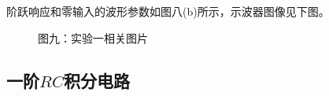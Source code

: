 \documentclass[a4paper]{article}
\begin{document}
    {{阶跃响应和零输入的波形参数如图八(b)所示，示波器图像见下图。}}

    \begin{figure}[htb]
        \centering
        \caption{\small 图九：实验一相关图片}
    \end{figure}

    \vspace{1cm}

    \subsection{一阶$RC$积分电路}\label{subsec:$rc$8}
\end{document}
